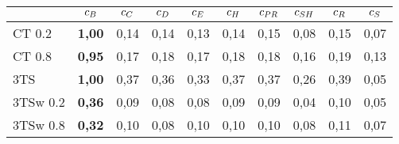 \begin{tabular}[ht]{l|c|c|c|c|c|c|c|c|c}
\hline
\hline
	& $c_{B}$	& $c_{C}$	& $c_{D}$	& $c_{E}$ & $c_{H}$	& $c_{PR}$ & $c_{SH}$ & $c_{R}$ & $c_{S}$\\
\hline
CT 0.2		 & \textbf{1,00} & 0,14 & 0,14 & 0,13 & 0,14 & 0,15 & 0,08 & 0,15 & 0,07\\
CT 0.8		 & \textbf{0,95} & 0,17 & 0,18 & 0,17 & 0,18 & 0,18 & 0,16 & 0,19 & 0,13\\
3TS		 	 & \textbf{1,00} & 0,37 & 0,36 & 0,33 & 0,37 & 0,37 & 0,26 & 0,39 & 0,05\\
3TSw 0.2	 & \textbf{0,36} & 0,09 & 0,08 & 0,08 & 0,09 & 0,09 & 0,04 & 0,10 & 0,05\\
3TSw 0.8	 & \textbf{0,32} & 0,10 & 0,08 & 0,10 & 0,10 & 0,10 & 0,08 & 0,11 & 0,07\\
\hline
\hline
\end{tabular}
